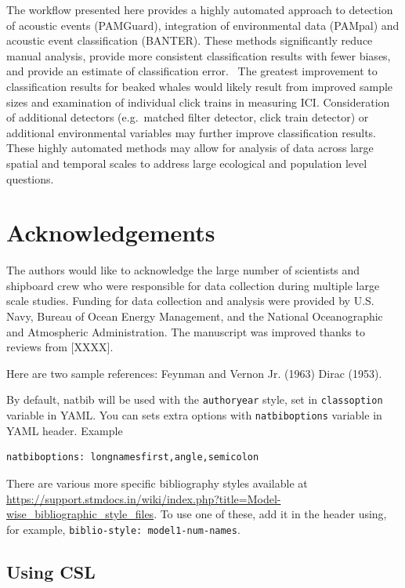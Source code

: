 \documentclass[
  letterpaper,
  DIV=11,
  numbers=noendperiod]{scrartcl}
\begin{document}
The workflow presented here provides a highly automated approach to
detection of acoustic events (PAMGuard), integration of environmental
data (PAMpal) and acoustic event classification (BANTER). These methods
significantly reduce manual analysis, provide more consistent
classification results with fewer biases, and provide an estimate of
classification error.~ The greatest improvement to classification
results for beaked whales would likely result from improved sample sizes
and examination of individual click trains in measuring ICI.
Consideration of additional detectors (e.g.~matched filter detector,
click train detector) or additional environmental variables may further
improve classification results. These highly automated methods may allow
for analysis of data across large spatial and temporal scales to address
large ecological and population level questions.

\hypertarget{acknowledgements}{%
\section{Acknowledgements}\label{acknowledgements}}

The authors would like to acknowledge the large number of scientists and
shipboard crew who were responsible for data collection during multiple
large scale studies. Funding for data collection and analysis were
provided by U.S. Navy, Bureau of Ocean Energy Management, and the
National Oceanographic and Atmospheric Administration. The manuscript
was improved thanks to reviews from {[}XXXX{]}.

Here are two sample references: Feynman and Vernon Jr. (1963) Dirac
(1953).

By default, natbib will be used with the \texttt{authoryear} style, set
in \texttt{classoption} variable in YAML. You can sets extra options
with \texttt{natbiboptions} variable in YAML header. Example

\begin{verbatim}
natbiboptions: longnamesfirst,angle,semicolon
\end{verbatim}

There are various more specific bibliography styles available at
\url{https://support.stmdocs.in/wiki/index.php?title=Model-wise_bibliographic_style_files}.
To use one of these, add it in the header using, for example,
\texttt{biblio-style:\ model1-num-names}.

\hypertarget{using-csl}{%
\subsection{Using CSL}\label{using-csl}}
\end{document}
